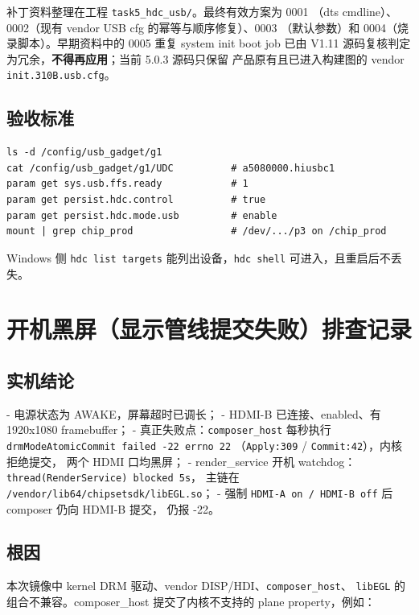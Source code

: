 补丁资料整理在工程 \texttt{task5\_hdc\_usb/}。最终有效方案为 0001
（dts cmdline）、0002（现有 vendor USB cfg 的幂等与顺序修复）、0003
（默认参数）和 0004（烧录脚本）。早期资料中的 0005 重复 system init boot
job 已由 V1.11 源码复核判定为冗余，\textbf{不得再应用}；当前 5.0.3 源码只保留
产品原有且已进入构建图的 vendor \texttt{init.310B.usb.cfg}。

\subsection{验收标准}

\begin{lstlisting}[style=shell]
ls -d /config/usb_gadget/g1
cat /config/usb_gadget/g1/UDC          # a5080000.hiusbc1
param get sys.usb.ffs.ready            # 1
param get persist.hdc.control          # true
param get persist.hdc.mode.usb         # enable
mount | grep chip_prod                 # /dev/.../p3 on /chip_prod
\end{lstlisting}

Windows 侧 \texttt{hdc list targets} 能列出设备，\texttt{hdc shell}
可进入，且重启后不丢失。

\section{开机黑屏（显示管线提交失败）排查记录}

\subsection{实机结论}

- 电源状态为 AWAKE，屏幕超时已调长；
- HDMI-B 已连接、enabled、有 1920x1080 framebuffer；
- 真正失败点：\texttt{composer\_host} 每秒执行
  \texttt{drmModeAtomicCommit failed -22 errno 22}
  （\texttt{Apply:309} / \texttt{Commit:42}），内核拒绝提交，
  两个 HDMI 口均黑屏；
- render\_service 开机 watchdog：
  \texttt{thread(RenderService) blocked 5s}，
  主链在 \texttt{/vendor/lib64/chipsetsdk/libEGL.so}；
- 强制 \texttt{HDMI-A on / HDMI-B off} 后 composer 仍向 HDMI-B 提交，
  仍报 -22。

\subsection{根因}

本次镜像中 kernel DRM 驱动、vendor DISP/HDI、\texttt{composer\_host}、
\texttt{libEGL} 的组合不兼容。composer\_host 提交了内核不支持的
plane property，例如：

